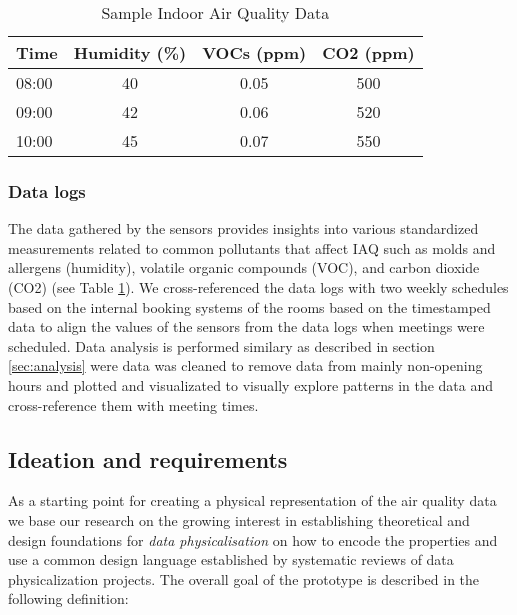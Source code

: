 \begin{table}[htbp]
    \centering
    \caption{Sample Indoor Air Quality Data}
    \begin{tabular}{lccc}
        \toprule
        \textbf{Time} & \textbf{Humidity (\%)} & \textbf{VOCs (ppm)} & \textbf{CO2 (ppm)} \\
        \midrule
        08:00 & 40 & 0.05 & 500 \\
        09:00 & 42 & 0.06 & 520 \\
        10:00 & 45 & 0.07 & 550 \\
        \bottomrule
    \end{tabular}
    \label{tab:air-quality}
\end{table}

\subsubsection{Data logs}

The data gathered by the sensors provides insights into various standardized measurements related to common pollutants that affect IAQ such as molds and allergens (humidity), volatile organic compounds (VOC), and carbon dioxide (CO2) (see Table \ref{tab:air-quality}). We cross-referenced the data logs with two weekly schedules based on the internal booking systems of the rooms based on the timestamped data to align the values of the sensors from the data logs when meetings were scheduled.
Data analysis is performed similary as described in section \ref{sec:analysis} were data was cleaned to remove data from mainly non-opening hours and plotted and visualizated to visually explore patterns in the data and cross-reference them with meeting times.


\subsection{Ideation and requirements}

As a starting point for creating a physical representation of the air quality data we base our research on the growing interest in establishing theoretical and design foundations for \textit{data physicalisation} \cite{hornecker_design_2023, sauve_physecology_2022, bae_making_2022} on how to encode the properties and use a common design language \cite{ranasinghe_encoding_2023, sosa_data_2018} established by systematic reviews of data physicalization projects. The overall goal of the prototype is described in the following definition:

